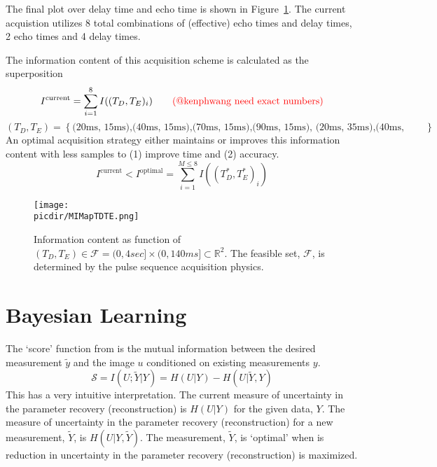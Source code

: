 \documentclass{article}         %
\theoremstyle{definition}
\theoremstyle{remark}
\newcommand{\picdir}{pdffig/}
\begin{document}
The final plot over delay time and echo time is shown in Figure~\ref{fig:MIMapTDTE}.
The current acquistion utilizes 8 total combinations of (effective) echo times 
and delay times, 2 echo times and 4 delay times.

The information content of this acquisition scheme is calculated as the superposition
\[
 I^\text{current} = \sum_{i=1}^8 I((T_D, T_E)_i)
\qquad \text{\color{red}(@kenphwang need exact numbers)}
\]
\[
   \left(T_D, T_E\right) = 
   \left\{
   \text{(20ms, 15ms),(40ms, 15ms),(70ms, 15ms),(90ms, 15ms),
         (20ms, 35ms),(40ms, 35ms),(70ms, 35ms),(90ms, 35ms)}
   \right\}
\]
An optimal acquisition strategy either maintains or improves this information content with
less samples to (1) improve time and (2) accuracy.
\[
  I^\text{current} < I^\text{optimal} = \sum_{i=1}^{M \leq 8} I((T^*_D, T^*_E)_i)
\]

\begin{figure}[h] 
\centering
\texttt{[image: \\picdir/MIMapTDTE.png]} 
\caption{ 
Information content as function of $(T_D, T_E) \in \mathcal{F} = (0,4sec] \times (0,140ms] \subset \mathbb{R}^2 $.
The feasible set, $\mathcal{F} $, 
is determined by the pulse sequence acquisition physics.
}\label{fig:MIMapTDTE}
\end{figure}

\section{Bayesian Learning}

The `score' function from 
\cite{seeger2010optimization} is the mutual information between the desired measurement $\tilde{y}$
and the image $u$ conditioned on existing measurements $y$.
\[ 
\mathcal{S}   =  I(U;\tilde{Y}|Y) =  H(U|Y) - H(U|\tilde{Y},Y)   
\]
This has a very intuitive interpretation.  The current measure of uncertainty
in the parameter recovery (reconstruction) is $H(U|Y)$ for the given data, $Y$. 
The measure of uncertainty in the parameter recovery (reconstruction) for
 a new measurement, $\tilde{Y}$, is $H(U|Y,\tilde{Y})$.
The measurement, $\tilde{Y}$, is `optimal' when is reduction
in uncertainty in the parameter recovery (reconstruction) is maximized.
\end{document}
